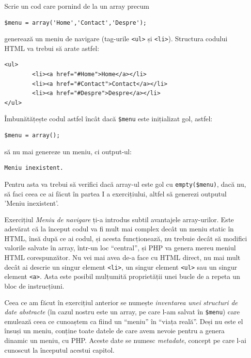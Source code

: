 \begin{Exercise}[title={Meniu de navigare},difficulty=1]

\ExePart

Scrie un cod care pornind de la un array precum
\begin{lstlisting}
$menu = array('Home','Contact','Despre');
\end{lstlisting}
generează un meniu de navigare (tag-urile \texttt{<ul>} și \texttt{<li>}).
Structura codului HTML va trebui să arate astfel:
\begin{verbatim}
<ul>
        <li><a href="#Home">Home</a></li>
        <li><a href="#Contact">Contact</a></li>
        <li><a href="#Despre">Despre</a></li>
</ul>
\end{verbatim}

\ExePart
Îmbunătățește codul astfel încât dacă \texttt{\$menu} este inițializat gol, astfel:
\begin{lstlisting}
$menu = array();
\end{lstlisting}
să nu mai genereze un meniu, ci output-ul:
\begin{verbatim}
Meniu inexistent.
\end{verbatim}
Pentru asta va trebui să verifici dacă array-ul este gol cu \texttt{empty(\$menu)}, dacă
nu, să faci ceea ce ai făcut în partea I a exercițiului, altfel să generezi
outputul 'Meniu inexistent'.
\end{Exercise}
Exercițiul \textit{Meniu de navigare} ți-a introdus subtil avantajele
array-urilor. Este adevărat că la început codul va fi mult mai
complex decât un meniu static în HTML, însă după ce ai codul, și
acesta funcționează, nu trebuie decât să modifici valorile salvate
în array, într-un loc ``central'', și PHP va genera mereu meniul HTML corespunzător.
Nu vei mai avea de-a face cu HTML direct, nu mai mult decât ai descrie un singur element
\texttt{<li>}, un singur element \texttt{<ul>} sau un singur element \texttt{<a>}.
Asta este posibil mulțumită proprietății unei bucle de a repeta un bloc de instrucțiuni.

Ceea ce am făcut în exercițiul anterior
se numește \textit{inventarea unei structuri de date abstracte} (în cazul
nostru este un array, pe care
l-am salvat în \texttt{\$menu}) care emulează ceea ce cunoaștem ca fiind un ``meniu'' în ``viața reală''.
Deși nu este el însuși un meniu, conține toate datele de care avem nevoie
pentru a genera dinamic un meniu, cu PHP. Aceste date se numesc \textsl{metadate},
concept pe care l-ai cunoscut la începutul acestui capitol.

